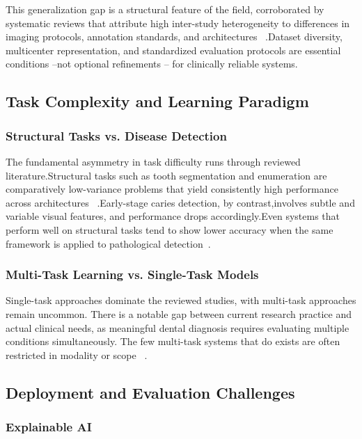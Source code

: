 \documentclass[conference]{IEEEtran}
\begin{document}
This generalization gap is a structural feature of the field, corroborated by systematic reviews that attribute high inter-study heterogeneity to differences in imaging protocols, annotation standards, and architectures ~\cite{khubrani2025detection}.Dataset diversity, multicenter representation, and standardized evaluation protocols are essential conditions –not optional refinements – for clinically reliable systems.


\subsection{Task Complexity and Learning Paradigm}

\subsubsection{Structural Tasks vs. Disease Detection}

The fundamental asymmetry in task difficulty runs through reviewed literature.Structural tasks such as tooth segmentation and enumeration are comparatively low-variance problems that yield consistently high performance across architectures ~\cite{bonfanti2025deep}.Early-stage caries detection, by contrast,involves subtle and variable visual features, and performance drops accordingly.Even systems that perform well on structural tasks tend to show lower accuracy when the same framework is applied to pathological  detection~\cite{nassiri2025yolo}.

\subsubsection{Multi-Task Learning vs. Single-Task Models}

Single-task approaches dominate the reviewed studies, with multi-task approaches remain uncommon. There is a notable gap between current research  practice and actual clinical needs, as meaningful dental diagnosis requires evaluating multiple conditions simultaneously. The few multi-task systems that do exists are often restricted in modality or scope ~\cite{chen2023deep}.

\subsection{Deployment and Evaluation Challenges}

\subsubsection{Explainable AI}
\end{document}
